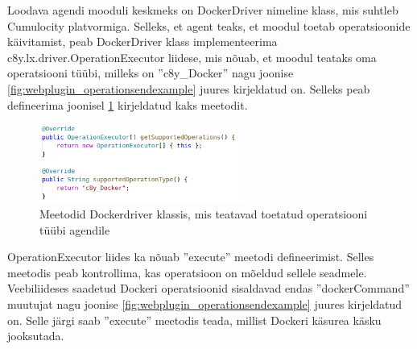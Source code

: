 \documentclass[12pt]{article}
\begin{document}
  Loodava agendi mooduli keskmeks on DockerDriver nimeline klass, mis suhtleb Cumulocity platvormiga.
  Selleks, et agent teaks, et moodul toetab operatsioonide käivitamist, peab
  DockerDriver klass implementeerima c8y.lx.driver.OperationExecutor
  liidese, mis nõuab, et moodul teataks oma operatsiooni tüübi,
  milleks on ''c8y\_Docker'' nagu joonise
  \ref{fig:webplugin_operationsendexample} juures kirjeldatud on. Selleks peab
  defineerima joonisel \ref{fig:dockerdriver_supportedoperationtype} kirjeldatud
  kaks meetodit.
 
  \begin{figure} [ht] %
  \begin{center}
  \includegraphics[width=0.6\textwidth]{dockerdriver_supportedoperationtype}
  \caption{Meetodid Dockerdriver klassis, mis teatavad toetatud operatsiooni tüübi agendile}
  \label{fig:dockerdriver_supportedoperationtype}
  \end{center}
  \end{figure}
  
  \FloatBarrier
  
  OperationExecutor liides ka nõuab ''execute'' meetodi defineerimist. Selles meetodis peab
  kontrollima, kas operatsioon on mõeldud sellele seadmele. Veebiliideses saadetud
  Dockeri operatsioonid sisaldavad endas ''dockerCommand'' muutujat nagu joonise
  \ref{fig:webplugin_operationsendexample} juures kirjeldatud on. Selle järgi saab ''execute''
  meetodis teada, millist Dockeri käsurea käsku jooksutada. 
 
\end{document}
